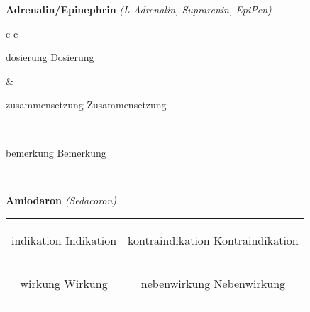 \documentclass[12pt]{beamer}
\begin{document}
\begin{frame}{
    \textbf{Adrenalin/Epinephrin}
    \textit{(L-Adrenalin, Suprarenin, EpiPen)}
}
    \begin{tabular}{c c}
        \begin{beamercolorbox}[wd=\boxwidth\textwidth,ht=\boxheight\textheight,sep=1em]{dosierung}
        Dosierung
        \end{beamercolorbox} & 
        \begin{beamercolorbox}[wd=\boxwidth\textwidth,ht=\boxheight\textheight,sep=1em]{zusammensetzung}
        Zusammensetzung
        \end{beamercolorbox} \\
        \begin{beamercolorbox}[wd=\textwidth,ht=\boxheight\textheight,sep=1em]{bemerkung}
        Bemerkung
        \end{beamercolorbox} \\
    \end{tabular}
\end{frame}

\begin{frame}{
    \textbf{Amiodaron}
    \textit{(Sedacoron)}
}
    \begin{tabular}{c c}
        \begin{beamercolorbox}[wd=\boxwidth\textwidth,ht=\boxheight\textheight,sep=1em]{indikation}
        Indikation
        \end{beamercolorbox} & 
        \begin{beamercolorbox}[wd=\boxwidth\textwidth,ht=\boxheight\textheight,sep=1em]{kontraindikation}
        Kontraindikation 
        \end{beamercolorbox} \\
        \begin{beamercolorbox}[wd=\boxwidth\textwidth,ht=\boxheight\textheight,sep=1em]{wirkung}
        Wirkung
        \end{beamercolorbox} & 
        \begin{beamercolorbox}[wd=\boxwidth\textwidth,ht=\boxheight\textheight,sep=1em]{nebenwirkung}
        Nebenwirkung
        \end{beamercolorbox} \\
    \end{tabular}
\end{frame}
\end{document}
